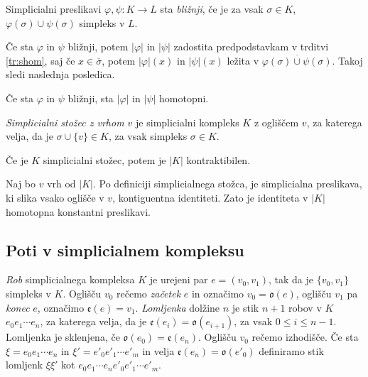 \documentclass[mat1]{fmfdelo}
\begin{document}
\begin{definicija}
    Simplicialni preslikavi $\varphi, \psi\colon K\rightarrow L$ sta \textit{bližnji}, če je za vsak $\sigma \in K$, $\varphi(\sigma)\cup \psi(\sigma)$ simpleks v $L$.
\end{definicija}

Če sta $\varphi$ in $\psi$ bližnji, potem $|\varphi|$ in $|\psi|$ zadostita predpodstavkam v trditvi \ref{tr:shom}, saj če $x\in \overline{\sigma}$, potem $|\varphi|(x)$ in $|\psi|(x)$ ležita v $\overline{\varphi(\sigma)\cup\psi(\sigma)}$. Takoj sledi naslednja posledica.

\begin{posledica}
    Če sta $\varphi$ in $\psi$ bližnji, sta $|\varphi|$ in $|\psi|$ homotopni.
\end{posledica}

\textit{Simplicialni stožec z vrhom $v$} je simplicialni kompleks $K$ z ogliščem $v$, za katerega velja, da je $\sigma \cup \{v\} \in K$, za vsak simpleks $\sigma\in K$.

\begin{posledica}
    Če je $K$ simplicialni stožec, potem je $|K|$ kontraktibilen.
    \label{pos:kontr}
\end{posledica}

\begin{dokaz}
    Naj bo $v$ vrh od $|K|$. Po definiciji simplicialnega stožca, je simplicialna preslikava, ki slika vsako oglišče v $v$, kontiguentna identiteti. Zato je identiteta v $|K|$ homotopna konstantni preslikavi.
\end{dokaz}

\subsection{Poti v simplicialnem kompleksu}

\textit{Rob} simplicialnega kompleksa $K$ je urejeni par $e=(v_0,v_1)$, tak da je $\{v_0,v_1\}$ simpleks v $K$. Oglišču $v_0$ rečemo \textit{začetek} $e$ in označimo 
$v_0=\mathfrak{o}(e)$, oglišču $v_1$ pa \textit{konec} $e$, 
označimo $\mathfrak{e}(e)=v_1$. \textit{Lomljenka} dolžine $n$ je stik $n+1$ robov v $K$ $e_0e_1 \cdots e_{n}$, za katerega velja, da je $\mathfrak{e}(e_i)=\mathfrak{o}(e_{i+1})$, za vsak $0\leq i \leq n-1$.
Lomljenka je sklenjena, če $\mathfrak{o}(e_0)=\mathfrak{e}(e_n)$. Oglišču $v_0$ rečemo izhodišče. Če sta $\xi =e_0e_1 \cdots e_n$ in $\xi'=e'_0e'_1 \cdots e'_{m}$ in velja $\mathfrak{e}(e_n)=\mathfrak{o}(e'_0)$ definiramo stik lomljenk $\xi\xi'$ kot $e_0e_1 \cdots e_{n}e'_0e'_1 \cdots e'_{m}$.
\end{document}
